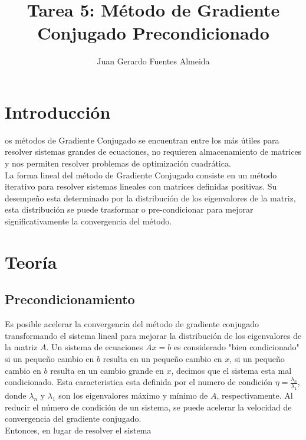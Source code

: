 \documentclass[10pt,journal,compsoc]{styles/IEEEtran}
\title{Tarea 5: M\'etodo de Gradiente Conjugado Precondicionado}
\author{Juan Gerardo Fuentes Almeida}
\begin{document}
\maketitle

\IEEEdisplaynontitleabstractindextext

\IEEEpeerreviewmaketitle

\section{Introducci\'on}

os métodos de Gradiente Conjugado se encuentran entre los m\'as útiles para resolver sistemas grandes de ecuaciones, no requieren almacenamiento de matrices y nos permiten resolver problemas de optimización cuadrática.\\

La forma lineal del método de Gradiente Conjugado consiste en un método iterativo para resolver sistemas lineales con matrices definidas positivas. Su desempeño esta determinado por la distribución de los eigenvalores de la matriz, esta distribución se puede trasformar o pre-condicionar para mejorar significativamente la convergencia del método.
 
\section{Teoría}

\subsection{Precondicionamiento}

Es posible acelerar la convergencia del método de gradiente conjugado transformando el sistema lineal para mejorar la distribución de los eigenvalores de la matriz $A$. Un sistema de ecuaciones $Ax=b$ es considerado "bien condicionado" si un pequeño cambio en $b$ resulta en un pequeño cambio en $x$, si un pequeño cambio en $b$ resulta en un cambio grande en $x$, decimos que el sistema esta mal condicionado. Esta caracteristica esta definida por el numero de condición $\eta=\frac{\lambda_n}{\lambda_1}$, donde $\lambda_n$ y $\lambda_1$ son los eigenvalores máximo y mínimo de $A$, respectivamente. Al reducir el número de condición de un sistema, se puede acelerar la velocidad de convergencia del gradiente conjugado.\\

Entonces, en lugar de resolver el sistema\\
\end{document}
